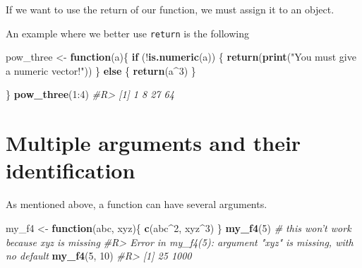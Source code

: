 \documentclass[]{book}
\newenvironment{Shaded}{}{}
\newcommand{\CommentTok}[1]{\textcolor[rgb]{0.38,0.63,0.69}{\textit{#1}}}
\newcommand{\ControlFlowTok}[1]{\textcolor[rgb]{0.00,0.44,0.13}{\textbf{#1}}}
\newcommand{\DecValTok}[1]{\textcolor[rgb]{0.25,0.63,0.44}{#1}}
\newcommand{\KeywordTok}[1]{\textcolor[rgb]{0.00,0.44,0.13}{\textbf{#1}}}
\newcommand{\NormalTok}[1]{#1}
\newcommand{\OperatorTok}[1]{\textcolor[rgb]{0.40,0.40,0.40}{#1}}
\newcommand{\StringTok}[1]{\textcolor[rgb]{0.25,0.44,0.63}{#1}}
\theoremstyle{definition}
\theoremstyle{definition}
\theoremstyle{definition}
\theoremstyle{remark}
\begin{document}
If we want to use the return of our function, we must assign it to an
object.

\begin{Shaded}
\end{Shaded}

An example where we better use \texttt{return} is the following

\begin{Shaded}
\begin{Highlighting}[]
\NormalTok{pow_three <-}\StringTok{ }\ControlFlowTok{function}\NormalTok{(a)\{}
  \ControlFlowTok{if}\NormalTok{ (}\OperatorTok{!}\KeywordTok{is.numeric}\NormalTok{(a)) \{}
    \KeywordTok{return}\NormalTok{(}\KeywordTok{print}\NormalTok{(}\StringTok{"You must give a numeric vector!"}\NormalTok{))}
\NormalTok{  \} }\ControlFlowTok{else}\NormalTok{ \{}
    \KeywordTok{return}\NormalTok{(a}\OperatorTok{^}\DecValTok{3}\NormalTok{)}
\NormalTok{  \}}
  
\NormalTok{\}}
\KeywordTok{pow_three}\NormalTok{(}\DecValTok{1}\OperatorTok{:}\DecValTok{4}\NormalTok{)}
\CommentTok{#R> [1]  1  8 27 64}
\end{Highlighting}
\end{Shaded}

\hypertarget{multiple-arguments-and-their-identification}{%
\section{Multiple arguments and their
identification}\label{multiple-arguments-and-their-identification}}

As mentioned above, a function can have several arguments.

\begin{Shaded}
\begin{Highlighting}[]
\NormalTok{my_f4 <-}\StringTok{ }\ControlFlowTok{function}\NormalTok{(abc, xyz)\{}
  \KeywordTok{c}\NormalTok{(abc}\OperatorTok{^}\DecValTok{2}\NormalTok{, xyz}\OperatorTok{^}\DecValTok{3}\NormalTok{)}
\NormalTok{\}}
\KeywordTok{my_f4}\NormalTok{(}\DecValTok{5}\NormalTok{) }\CommentTok{# this won't work because xyz is missing}
\CommentTok{#R> Error in my_f4(5): argument "xyz" is missing, with no default}
\KeywordTok{my_f4}\NormalTok{(}\DecValTok{5}\NormalTok{, }\DecValTok{10}\NormalTok{)}
\CommentTok{#R> [1]   25 1000}
\end{Highlighting}
\end{Shaded}
\end{document}
